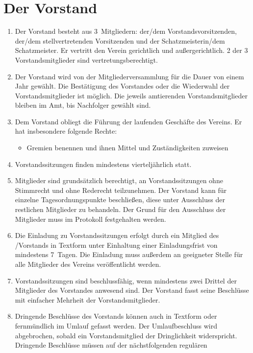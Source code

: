 \documentclass[a4paper,12pt]{scrartcl}
\begin{document}
\section{Der Vorstand}
\begin{enumerate}
  \item Der Vorstand besteht aus 3~Mitgliedern: der/dem
    Vorstandsvorsitzenden, der/dem stellvertretenden Vorsitzenden und der 
    Schatzmeisterin/dem Schatzmeister. Er vertritt den Verein gerichtlich 
	und außergerichtlich. 2 der 3 Vorstandsmitglieder sind vertretungsberechtigt.
  \item Der Vorstand wird von der Mitgliederversammlung für die Dauer von einem
    Jahr gewählt. Die Bestätigung des Vorstandes oder die Wiederwahl der
	Vorstandsmitglieder ist möglich. Die jeweils amtierenden Vorstandsmitglieder 
	bleiben im Amt, bis Nachfolger gewählt sind.
  \item Dem Vorstand obliegt die Führung der laufenden Geschäfte des Vereins. Er
    hat insbesondere folgende Rechte:
    \begin{itemize}
      \item Gremien benennen und ihnen Mittel und Zuständigkeiten zuweisen
    \end{itemize}
  \item Vorstandssitzungen finden mindestens vierteljährlich statt.
  \item Mitglieder sind grundsätzlich berechtigt, an Vorstandssitzungen ohne
    Stimmrecht und ohne Rederecht teilzunehmen. Der Vorstand kann für einzelne
    Tagesordnungspunkte beschließen, diese unter Ausschluss der restlichen
    Mitglieder zu behandeln. Der Grund für den Ausschluss der Mitglieder muss im
    Protokoll festgehalten werden.
  \item Die Einladung zu Vorstandssitzungen erfolgt durch ein Mitglied des
    /Vorstands in Textform
    unter Einhaltung einer Einladungsfrist von mindestens 7~Tagen. Die Einladung
    muss außerdem an geeigneter Stelle für alle Mitglieder des Vereins
    veröffentlicht werden.
  \item Vorstandssitzungen sind beschlussfähig, wenn mindestens zwei Drittel der
    Mitglieder des Vorstandes anwesend sind. Der Vorstand fasst seine Beschlüsse
    mit einfacher Mehrheit der Vorstandsmitglieder.
  \item Dringende Beschlüsse des Vorstands können auch in Textform oder
    fernmündlich im Umlauf gefasst werden. Der Umlaufbeschluss 
    wird abgebrochen, sobald ein Vorstandsmitglied der Dringlichkeit
    widerspricht. Dringende Beschlüsse müssen auf der nächstfolgenden regulären

\end{enumerate}
\end{document}
